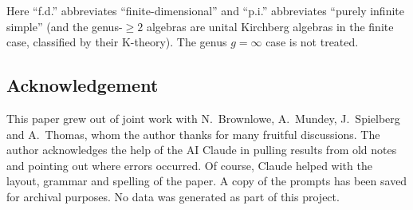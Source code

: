 \documentclass[12pt,reqno]{amsart}
\theoremstyle{plain}
\theoremstyle{definition}
\begin{document}
\noindent Here ``f.d.'' abbreviates ``finite-dimensional'' and ``p.i.'' abbreviates ``purely infinite simple'' (and the genus-$\ge 2$ algebras are unital
Kirchberg algebras in the finite case, classified by their K-theory). The genus $g=\infty$ case is
not treated.

\pagebreak[4]

\subsection*{Acknowledgement}
This paper grew out of joint work with N.~Brownlowe, A.~Mundey, J.~Spielberg and A.~Thomas, whom the author thanks for
many fruitful discussions. The author acknowledges the help of the AI Claude in pulling results from old notes and pointing
out where errors occurred. Of course, Claude helped with the layout, grammar and spelling of the
paper. A copy of the prompts has been saved for archival purposes. No data was generated as part
of this project.
\end{document}
